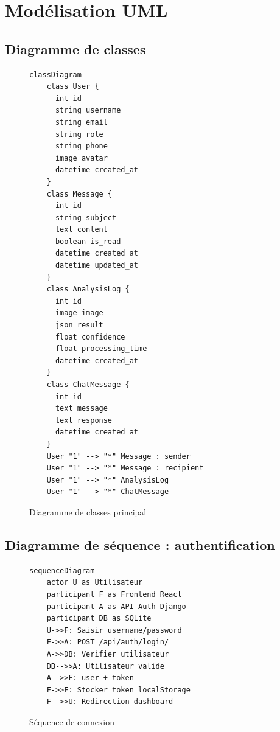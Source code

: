 \section{Modélisation UML}
\subsection{Diagramme de classes}
\begin{figure}[H]
\centering
\caption{Diagramme de classes principal}
\begin{lstlisting}[language=mermaid]
classDiagram
    class User {
      int id
      string username
      string email
      string role
      string phone
      image avatar
      datetime created_at
    }
    class Message {
      int id
      string subject
      text content
      boolean is_read
      datetime created_at
      datetime updated_at
    }
    class AnalysisLog {
      int id
      image image
      json result
      float confidence
      float processing_time
      datetime created_at
    }
    class ChatMessage {
      int id
      text message
      text response
      datetime created_at
    }
    User "1" --> "*" Message : sender
    User "1" --> "*" Message : recipient
    User "1" --> "*" AnalysisLog
    User "1" --> "*" ChatMessage
\end{lstlisting}
\end{figure}

\subsection{Diagramme de séquence : authentification}
\begin{figure}[H]
\centering
\caption{Séquence de connexion}
\begin{lstlisting}[language=mermaid]
sequenceDiagram
    actor U as Utilisateur
    participant F as Frontend React
    participant A as API Auth Django
    participant DB as SQLite
    U->>F: Saisir username/password
    F->>A: POST /api/auth/login/
    A->>DB: Verifier utilisateur
    DB-->>A: Utilisateur valide
    A-->>F: user + token
    F->>F: Stocker token localStorage
    F-->>U: Redirection dashboard
\end{lstlisting}
\end{figure}

